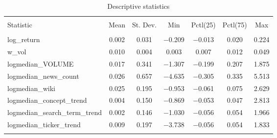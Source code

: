\begin{table}[!htbp] \centering 
  \caption{Descriptive statistics} 
  \label{tab:desc_stat} 
\begin{tabular}{@{\extracolsep{5pt}}lcccccc} 
\\[-1.8ex]\hline 
\hline \\[-1.8ex] 
Statistic & \multicolumn{1}{c}{Mean} & \multicolumn{1}{c}{St. Dev.} & \multicolumn{1}{c}{Min} & \multicolumn{1}{c}{Pctl(25)} & \multicolumn{1}{c}{Pctl(75)} & \multicolumn{1}{c}{Max} \\ 
\hline \\[-1.8ex] 
log\_return & 0.002 & 0.031 & $-$0.209 & $-$0.013 & 0.020 & 0.224 \\ 
w\_vol & 0.010 & 0.004 & 0.003 & 0.007 & 0.012 & 0.049 \\ 
logmedian\_VOLUME & 0.017 & 0.341 & $-$1.307 & $-$0.199 & 0.207 & 1.875 \\ 
logmedian\_news\_count & 0.026 & 0.657 & $-$4.635 & $-$0.305 & 0.335 & 5.513 \\ 
logmedian\_wiki & 0.025 & 0.195 & $-$0.953 & $-$0.061 & 0.075 & 2.629 \\ 
logmedian\_concept\_trend & 0.004 & 0.150 & $-$0.869 & $-$0.053 & 0.047 & 2.813 \\ 
logmedian\_search\_term\_trend & 0.002 & 0.146 & $-$1.030 & $-$0.056 & 0.054 & 1.966 \\ 
logmedian\_ticker\_trend & 0.009 & 0.197 & $-$3.738 & $-$0.056 & 0.054 & 1.833 \\ 
\hline \\[-1.8ex] 
\end{tabular} 
\end{table} 








